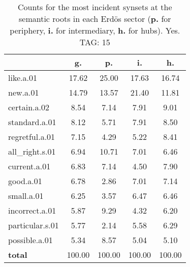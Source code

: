 \begin{table}[h!]
\begin{center}
\begin{tabular}{| l | c | c | c | c |}\hline
 & g. & p. & i. & h. \\\hline
like.a.01 & 17.62  & 25.00  & 17.63  & 16.74 \\\hline
new.a.01 & 14.79  & 13.57  & 21.40  & 11.81 \\\hline
certain.a.02 & 8.54  & 7.14  & 7.91  & 9.01 \\\hline
standard.a.01 & 8.12  & 5.71  & 7.91  & 8.50 \\\hline
regretful.a.01 & 7.15  & 4.29  & 5.22  & 8.41 \\\hline
all\_right.s.01 & 6.94  & 10.71  & 7.01  & 6.46 \\\hline
current.a.01 & 6.83  & 7.14  & 4.50  & 7.90 \\\hline
good.a.01 & 6.78  & 2.86  & 7.01  & 7.14 \\\hline
small.a.01 & 6.25  & 3.57  & 6.47  & 6.46 \\\hline
incorrect.a.01 & 5.87  & 9.29  & 4.32  & 6.20 \\\hline
particular.s.01 & 5.77  & 2.14  & 5.58  & 6.29 \\\hline
possible.a.01 & 5.34  & 8.57  & 5.04  & 5.10 \\\hline
{{\bf total}} & 100.00  & 100.00  & 100.00  & 100.00 \\\hline
\end{tabular}
\caption{Counts for the most incident synsets at the semantic roots in each Erd\"os sector ({\bf p.} for periphery, {\bf i.} for intermediary, {\bf h.} for hubs). Yes. TAG: 15}
\end{center}
\end{table}